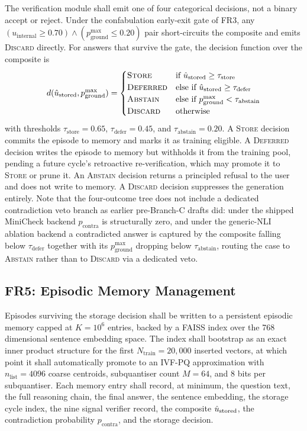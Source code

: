 The verification module shall emit one of four categorical decisions, not a binary accept or reject. Under the confabulation early-exit gate of FR3, any $(u_{\text{internal}} \geq 0.70) \wedge (p_{\text{ground}}^{\text{max}} \leq 0.20)$ pair short-circuits the composite and emits \textsc{Discard} directly. For answers that survive the gate, the decision function over the composite is
\begin{equation}
d(\hat{u}_{\text{stored}}, p_{\text{ground}}^{\text{max}}) =
\begin{cases}
\textsc{Store}    & \text{if } \hat{u}_{\text{stored}} \geq \tau_{\text{store}} \\
\textsc{Deferred} & \text{else if } \hat{u}_{\text{stored}} \geq \tau_{\text{defer}} \\
\textsc{Abstain}  & \text{else if } p_{\text{ground}}^{\text{max}} < \tau_{\text{abstain}} \\
\textsc{Discard}  & \text{otherwise}
\end{cases}
\label{eq:decide}
\end{equation}
with thresholds $\tau_{\text{store}} = 0.65$, $\tau_{\text{defer}} = 0.45$, and $\tau_{\text{abstain}} = 0.20$. A \textsc{Store} decision commits the episode to memory and marks it as training eligible. A \textsc{Deferred} decision writes the episode to memory but withholds it from the training pool, pending a future cycle's retroactive re-verification, which may promote it to \textsc{Store} or prune it. An \textsc{Abstain} decision returns a principled refusal to the user and does not write to memory. A \textsc{Discard} decision suppresses the generation entirely. Note that the four-outcome tree does not include a dedicated contradiction veto branch as earlier pre-Branch-C drafts did: under the shipped MiniCheck backend $p_{\text{contra}}$ is structurally zero, and under the generic-NLI ablation backend a contradicted answer is captured by the composite falling below $\tau_{\text{defer}}$ together with its $p_{\text{ground}}^{\text{max}}$ dropping below $\tau_{\text{abstain}}$, routing the case to \textsc{Abstain} rather than to \textsc{Discard} via a dedicated veto.

\subsection{FR5: Episodic Memory Management}
\label{sec:fr5}

Episodes surviving the storage decision shall be written to a persistent episodic memory capped at $K = 10^{6}$ entries, backed by a FAISS index over the 768 dimensional sentence embedding space. The index shall bootstrap as an exact inner product structure for the first $N_{\text{train}} = 20{,}000$ inserted vectors, at which point it shall automatically promote to an IVF-PQ approximation with $n_{\text{list}} = 4096$ coarse centroids, subquantiser count $M = 64$, and $8$ bits per subquantiser. Each memory entry shall record, at minimum, the question text, the full reasoning chain, the final answer, the sentence embedding, the storage cycle index, the nine signal verifier record, the composite $\hat{u}_{\text{stored}}$, the contradiction probability $p_{\text{contra}}$, and the storage decision.

